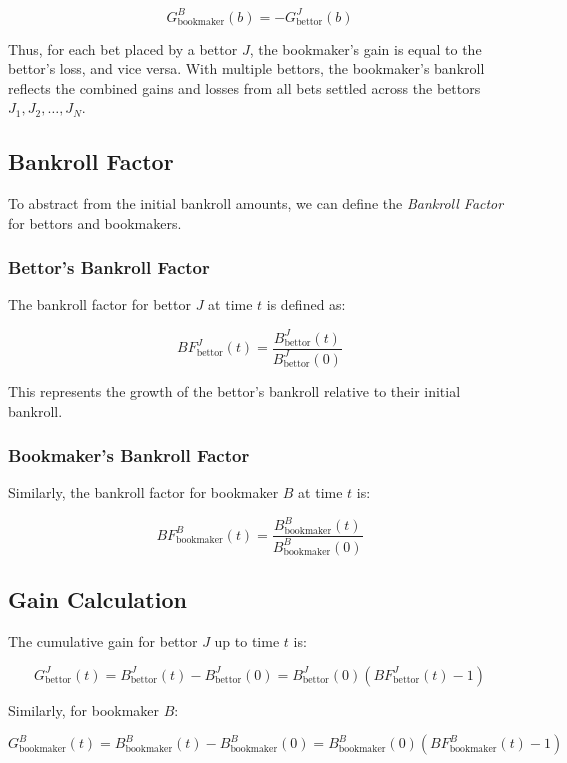 \[
G_{\text{bookmaker}}^B(b) = - G_{\text{bettor}}^J(b)
\]

Thus, for each bet placed by a bettor \( J \), the bookmaker’s gain is equal to the bettor’s loss, and vice versa. With multiple bettors, the bookmaker's bankroll reflects the combined gains and losses from all bets settled across the bettors \( J_1, J_2, \dots, J_N \).


\subsection{Bankroll Factor}

To abstract from the initial bankroll amounts, we can define the \textit{Bankroll Factor} for bettors and bookmakers.

\subsubsection{Bettor's Bankroll Factor}

The bankroll factor for bettor \( J \) at time \( t \) is defined as:

\[
BF_{\text{bettor}}^J(t) = \frac{B_{\text{bettor}}^J(t)}{B_{\text{bettor}}^J(0)}
\]

This represents the growth of the bettor's bankroll relative to their initial bankroll.

\subsubsection{Bookmaker's Bankroll Factor}

Similarly, the bankroll factor for bookmaker \( B \) at time \( t \) is:

\[
BF_{\text{bookmaker}}^B(t) = \frac{B_{\text{bookmaker}}^B(t)}{B_{\text{bookmaker}}^B(0)}
\]

\subsection{Gain Calculation}

The cumulative gain for bettor \( J \) up to time \( t \) is:

\[
G_{\text{bettor}}^J(t) = B_{\text{bettor}}^J(t) - B_{\text{bettor}}^J(0) = B_{\text{bettor}}^J(0) \left( BF_{\text{bettor}}^J(t) - 1 \right)
\]

Similarly, for bookmaker \( B \):

\[
G_{\text{bookmaker}}^B(t) = B_{\text{bookmaker}}^B(t) - B_{\text{bookmaker}}^B(0) = B_{\text{bookmaker}}^B(0) \left( BF_{\text{bookmaker}}^B(t) - 1 \right)
\]


